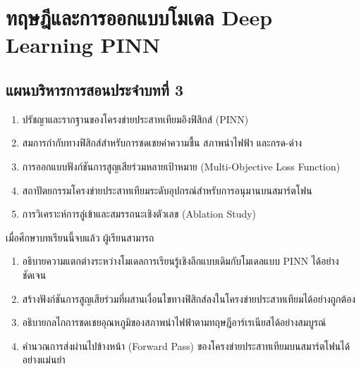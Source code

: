\chapter{ทฤษฎีและการออกแบบโมเดล Deep Learning PINN}
\label{chap:ch03}

\section*{แผนบริหารการสอนประจำบทที่ 3}

\begin{tcolorbox}[
    enhanced, breakable,
    colback=white, colframe=rbruNavy,
    fonttitle=\bfseries\color{white},
    title={1. หัวข้อเนื้อหาประจำบท},
    arc=1.5mm, boxrule=0.8pt, leftrule=3.5mm
]
\begin{enumerate}
    \item ปรัชญาและรากฐานของโครงข่ายประสาทเทียมอิงฟิสิกส์ (PINN)
    \item สมการกำกับทางฟิสิกส์สำหรับการชดเชยค่าความชื้น สภาพนำไฟฟ้า และกรด-ด่าง
    \item การออกแบบฟังก์ชันการสูญเสียร่วมหลายเป้าหมาย (Multi-Objective Loss Function)
    \item สถาปัตยกรรมโครงข่ายประสาทเทียมระดับอุปกรณ์สำหรับการอนุมานบนสมาร์ตโฟน
    \item การวิเคราะห์การลู่เข้าและสมรรถนะเชิงตัวเลข (Ablation Study)
\end{enumerate}
\end{tcolorbox}

\begin{tcolorbox}[
    enhanced, breakable,
    colback=white, colframe=rbruNavy,
    fonttitle=\bfseries\color{white},
    title={2. วัตถุประสงค์เชิงพฤติกรรม},
    arc=1.5mm, boxrule=0.8pt, leftrule=3.5mm
]
เมื่อศึกษาบทเรียนนี้จบแล้ว ผู้เรียนสามารถ
\begin{enumerate}
    \item อธิบายความแตกต่างระหว่างโมเดลการเรียนรู้เชิงลึกแบบเดิมกับโมเดลแบบ PINN ได้อย่างชัดเจน
    \item สร้างฟังก์ชันการสูญเสียร่วมที่ผสานเงื่อนไขทางฟิสิกส์ลงในโครงข่ายประสาทเทียมได้อย่างถูกต้อง
    \item อธิบายกลไกการชดเชยอุณหภูมิของสภาพนำไฟฟ้าตามทฤษฎีอาร์เรเนียสได้อย่างสมบูรณ์
    \item คำนวณการส่งผ่านไปข้างหน้า (Forward Pass) ของโครงข่ายประสาทเทียมบนสมาร์ตโฟนได้อย่างแม่นยำ
\end{enumerate}
\end{tcolorbox}

